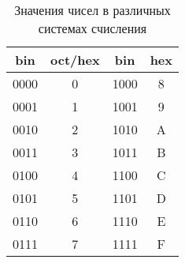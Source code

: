 \begin{table}[htpb]
  \centering
  \caption{Значения чисел в различных системах счисления}
  \label{tab:label}
  \begin{tabular}{ | c | c | c | c | }
    \hline
    bin & oct/hex & bin & hex \\
    \hline
    0000 & 0 & 1000 & 8 \\
    0001 & 1 & 1001 & 9 \\
    0010 & 2 & 1010 & A \\
    0011 & 3 & 1011 & B \\
    0100 & 4 & 1100 & C \\
    0101 & 5 & 1101 & D \\
    0110 & 6 & 1110 & E \\
    0111 & 7 & 1111 & F \\
    \hline
  \end{tabular}
\end{table}

